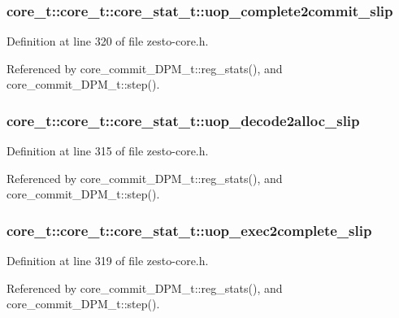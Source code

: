 \subsubsection[{uop\_\-complete2commit\_\-slip}]{ core\_\-t::core\_\-t::core\_\-stat\_\-t::uop\_\-complete2commit\_\-slip}\label{structcore__t_1_1core__stat__t_dcedefe56d42005a7e99bb8aabca20bb}




Definition at line 320 of file zesto-core.h.

Referenced by core\_\-commit\_\-DPM\_\-t::reg\_\-stats(), and core\_\-commit\_\-DPM\_\-t::step().
\subsubsection[{uop\_\-decode2alloc\_\-slip}]{ core\_\-t::core\_\-t::core\_\-stat\_\-t::uop\_\-decode2alloc\_\-slip}\label{structcore__t_1_1core__stat__t_a68f914b607a15a547982a11acb46de6}




Definition at line 315 of file zesto-core.h.

Referenced by core\_\-commit\_\-DPM\_\-t::reg\_\-stats(), and core\_\-commit\_\-DPM\_\-t::step().
\subsubsection[{uop\_\-exec2complete\_\-slip}]{ core\_\-t::core\_\-t::core\_\-stat\_\-t::uop\_\-exec2complete\_\-slip}\label{structcore__t_1_1core__stat__t_615ce46ec3e9886d71524faa67c1d7f9}




Definition at line 319 of file zesto-core.h.

Referenced by core\_\-commit\_\-DPM\_\-t::reg\_\-stats(), and core\_\-commit\_\-DPM\_\-t::step().
